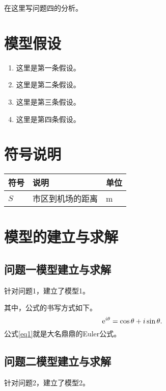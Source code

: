 \documentclass[withoutpreface,bwprint]{cumcmthesis}
\begin{document}
在这里写问题四的分析。

\section{模型假设}

\begin{enumerate}
    \item 这里是第一条假设。
    \item 这里是第二条假设。
    \item 这里是第三条假设。
    \item 这里是第四条假设。
\end{enumerate}

\section{符号说明}

\begin{table} [ht]
    \centering 
    \begin{tabular} {  p{}<{\centering}p{}<{\centering}p{}<{\centering}  }
        \toprule
        \textbf{符号}&\textbf{说明}&\textbf{单位}\\
        \midrule
        $S$&市区到机场的距离&m\\
        \bottomrule
    \end{tabular}
\end{table}


\section{模型的建立与求解}

\subsection{问题一模型建立与求解}

针对问题1，建立了模型1。

其中，公式的书写方式如下。
\begin{equation}
    \label{eq1}
    {\rm{e}}^{i\theta}=\cos\theta+i\sin\theta.
\end{equation}
公式\ref{eq1}就是大名鼎鼎的Euler公式。

\subsection{问题二模型建立与求解}

针对问题2，建立了模型2。
\end{document}
